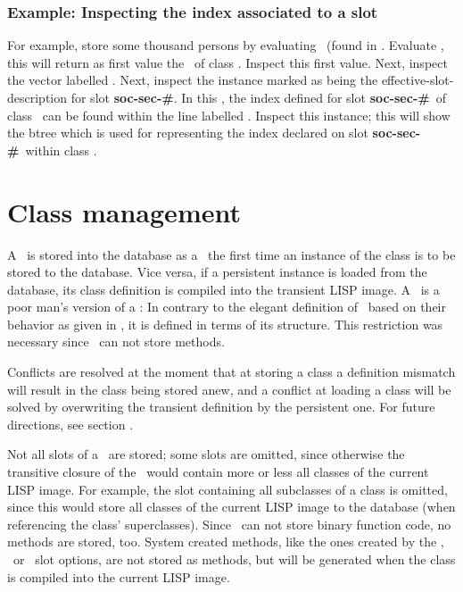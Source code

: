 \subsubsection[Inspecting the index associated to a slot]{Example:
  Inspecting the index associated to a slot} 

For example, store some thousand persons by evaluating
\ (found in
.
Evaluate , this will return as first
value the \clsdo\ of class . Inspect this first value.
Next, inspect the vector labelled .
Next, inspect the instance marked as being the
effective-slot-description for slot \textbf{soc-sec-\#}. In this \sltdo,
the index defined for slot \textbf{soc-sec-\#}\ of class \ 
can be found within the line labelled . Inspect
this instance; this will show the btree which is used for representing
the index declared on slot \textbf{soc-sec-\#}\ within class
.

\section{Class management}

A \clsmo\ is stored into the database as a \clsdo\ the first time an
instance of the class is to be stored to the database. Vice versa, if
a persistent instance is loaded from the database, its class
definition is compiled into the transient LISP image.  A \clsdo\ is a
poor man's version of a \clsmo: In contrary to the elegant definition
of \mo[s]\ based on their behavior as given in \cite{bib:AMOP}, it is
defined in terms of its structure.  This restriction was necessary
since \plob\ can not store methods.

Conflicts are resolved at the moment that at storing a class a
definition mismatch will result in the class being stored anew, and a
conflict at loading a class will be solved by overwriting the
transient definition by the persistent one. For future directions, see
section \Nameref{sec:Views}.

Not all slots of a \clsmo\ are stored; some slots are omitted, since
otherwise the transitive closure of the \clsmo\ would contain more or
less all classes of the current LISP image. For example, the slot
containing all subclasses of a class is omitted, since this would
store all classes of the current LISP image to the database (when
referencing the class' superclasses).  Since \plob\ can not store
binary function code, no methods are stored, too.  System created
methods, like the ones created by the \lisp{:accessor},
\ or \ slot options, are not stored as
methods, but will be generated when the class is compiled into the
current LISP image.

